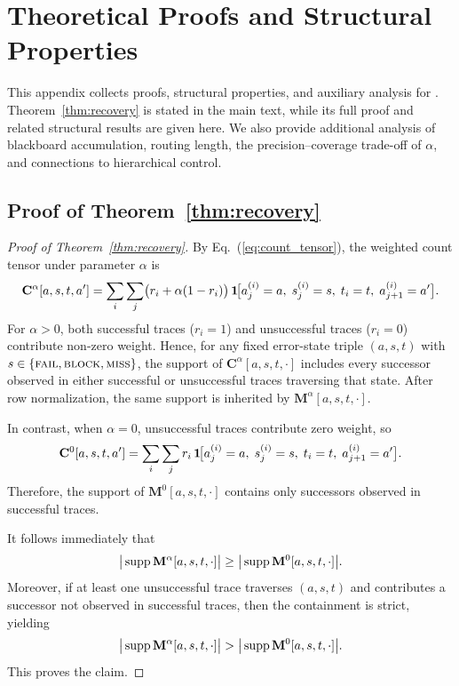 \section{Theoretical Proofs and Structural Properties}
\label{app:proofs}

This appendix collects proofs, structural properties, and auxiliary analysis for \starname{}.
Theorem~\ref{thm:recovery} is stated in the main text, while its full proof and related structural results are given here.
We also provide additional analysis of blackboard accumulation, routing length, the precision--coverage trade-off of $\alpha$, and connections to hierarchical control.

\subsection{Proof of Theorem~\ref{thm:recovery}}
\label{app:proof_recovery}

\begin{proof}[Proof of Theorem~\ref{thm:recovery}]
By Eq.~(\ref{eq:count_tensor}), the weighted count tensor under parameter $\alpha$ is
\[
\mathbf{C}^{\alpha}[a,s,t,a']
=
\sum_i \sum_j
\bigl(r_i+\alpha(1-r_i)\bigr)\,
\mathbf{1}\!\bigl[a^{(i)}_j=a,\; s^{(i)}_j=s,\; t_i=t,\; a^{(i)}_{j+1}=a'\bigr].
\]
For $\alpha>0$, both successful traces ($r_i=1$) and unsuccessful traces ($r_i=0$) contribute non-zero weight.
Hence, for any fixed error-state triple $(a,s,t)$ with $s\in\{\textnormal{\textsc{fail}},\textnormal{\textsc{block}},\textnormal{\textsc{miss}}\}$, the support of $\mathbf{C}^{\alpha}[a,s,t,\cdot]$ includes every successor observed in either successful or unsuccessful traces traversing that state.
After row normalization, the same support is inherited by $\mathbf{M}^{\alpha}[a,s,t,\cdot]$.

In contrast, when $\alpha=0$, unsuccessful traces contribute zero weight, so
\[
\mathbf{C}^{0}[a,s,t,a']
=
\sum_i \sum_j
r_i\,
\mathbf{1}\!\bigl[a^{(i)}_j=a,\; s^{(i)}_j=s,\; t_i=t,\; a^{(i)}_{j+1}=a'\bigr].
\]
Therefore, the support of $\mathbf{M}^{0}[a,s,t,\cdot]$ contains only successors observed in successful traces.

It follows immediately that
\[
\bigl|\,\textup{supp}\, \mathbf{M}^{\alpha}[a,s,t,\cdot]\bigr|
\ge
\bigl|\,\textup{supp}\, \mathbf{M}^{0}[a,s,t,\cdot]\bigr|.
\]
Moreover, if at least one unsuccessful trace traverses $(a,s,t)$ and contributes a successor not observed in successful traces, then the containment is strict, yielding
\[
\bigl|\,\textup{supp}\, \mathbf{M}^{\alpha}[a,s,t,\cdot]\bigr|
>
\bigl|\,\textup{supp}\, \mathbf{M}^{0}[a,s,t,\cdot]\bigr|.
\]
This proves the claim.
\end{proof}

